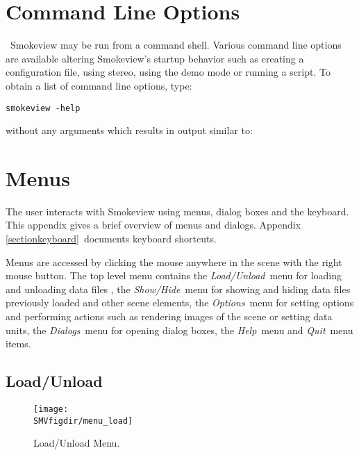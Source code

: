 \documentclass[11pt,twoside]{book}
\begin{document}

\chapter{Command Line Options}
\label{sectioncommand}\ Smokeview may be run from a command shell.
Various command line options are available altering Smokeview's
startup behavior such as creating a configuration file, using
stereo, using the demo mode or running a script. To obtain a list
of command line options, type:
\begin{lstlisting}
smokeview -help
\end{lstlisting}
\noindent without any arguments which results in output similar to:\\




\chapter{Menus}
\label{sectionmenu}

The user interacts with
Smokeview using menus, dialog boxes and the keyboard.
This appendix gives a brief overview of menus and dialogs.
Appendix \ref{sectionkeyboard}\ documents keyboard shortcuts.

Menus are accessed by clicking the mouse anywhere in the scene with the right mouse button.
The top level menu contains the {\em Load/Unload}\ menu for loading
and unloading data files , the {\em Show/Hide}\ menu for showing and
hiding data files previously loaded and other scene elements, the {\em Options}\ menu
for setting options and performing actions such as rendering images of the scene or setting data units, the {\em Dialogs}\ menu for opening dialog boxes,
the {\em Help}\ menu and {\em Quit}\ menu items.

\section{Load/Unload}
\begin{figure}[bph]
\begin{center}
\texttt{[image: \\SMVfigdir/menu\_load]}
\caption{Load/Unload Menu.}
\label{fig_loadmenu}
\end{center}
\end{figure}
\end{document}
